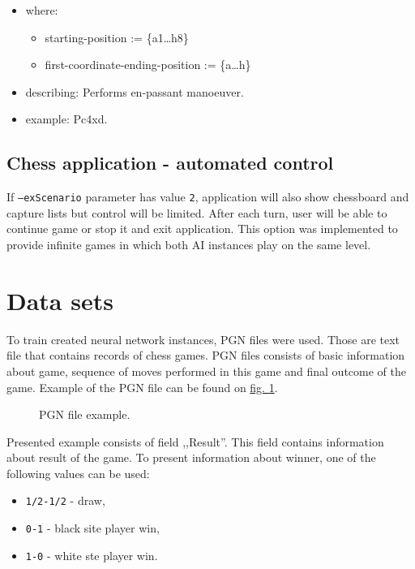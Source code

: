 \begin{itemize}
        \begin{itemize}[label={}]
            \item where:
            \begin{itemize}[label={}]
                \item starting-position := \{a1\dots h8\}
                \item first-coordinate-ending-position := \{a\dots h\} 
            \end{itemize}
            \item describing: Performs en-passant manoeuver.
            \item example: Pc4xd.
        \end{itemize}
\end{itemize}

\subsection{Chess application - automated control}
If \texttt{--exScenario} parameter has value \texttt{2}, application will also show chessboard and capture lists but control will be limited. After each turn, user will be able to continue game or stop it and exit application. This option was implemented to provide infinite games in which both AI instances play on the same level.

\section{Data sets}\label{sec:data-sets}
To train created neural network instances, PGN files were used. Those are text file that contains records of chess games. PGN files consists of basic information about game, sequence of moves performed in this game and final outcome of the game. Example of the PGN file can be found on \hyperref[fig:pgn-example]{fig. \ref*{fig:pgn-example}}.
\begin{figure}
    \centering
\begin{mdframed}
\end{mdframed}
    \caption{PGN file example.}
    \label{fig:pgn-example}
\end{figure}
Presented example consists of field ,,Result''. This field contains information about result of the game. To present information about winner, one of the following values can be used:
\begin{itemize}
    \item \texttt{1/2-1/2} - draw,
    \item \texttt{0-1} - black site player win,
    \item \texttt{1-0} - white ste player win.
\end{itemize}


